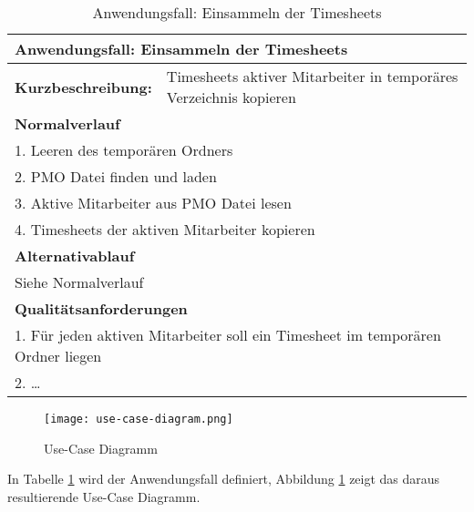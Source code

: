 \begin{table}[H]
    \begin{tabular}[H]{|l|l|}
        \hline
        \multicolumn{2}{|l|}{\textbf{Anwendungsfall:} Einsammeln der Timesheets} \\
        \hline
        \textbf{Kurzbeschreibung:} & Timesheets aktiver Mitarbeiter in temporäres Verzeichnis kopieren \\
        \hline
        \multicolumn{2}{|l|}{\textbf{Normalverlauf}} \\
        \hline
        \multicolumn{2}{|l|}{1. Leeren des temporären Ordners} \\
        \multicolumn{2}{|l|}{2. PMO Datei finden und laden} \\
        \multicolumn{2}{|l|}{3. Aktive Mitarbeiter aus PMO Datei lesen} \\
        \multicolumn{2}{|l|}{4. Timesheets der aktiven Mitarbeiter kopieren} \\
        \hline
        \multicolumn{2}{|l|}{\textbf{Alternativablauf}} \\
        \hline
        \multicolumn{2}{|l|}{Siehe Normalverlauf} \\
        \multicolumn{2}{|l|}{\textbf{Qualitätsanforderungen}} \\
        \hline
        \multicolumn{2}{|l|}{1. Für jeden aktiven Mitarbeiter soll ein Timesheet im temporären Ordner liegen} \\
        \multicolumn{2}{|l|}{2. \dots} \\
        \hline
    \end{tabular}
    \caption{Anwendungsfall: Einsammeln der Timesheets}
    \label{tab:use-case-analyse-timesheets}
\end{table}

\begin{figure}[H]
    \centering
    \texttt{[image: use-case-diagram.png]}
    \caption{Use-Case Diagramm}
    \label{fig:use-case-diagram}
\end{figure}

In Tabelle \ref{tab:use-case-analyse-timesheets} wird der Anwendungsfall definiert, Abbildung \ref{fig:use-case-diagram} zeigt das daraus resultierende Use-Case Diagramm.



